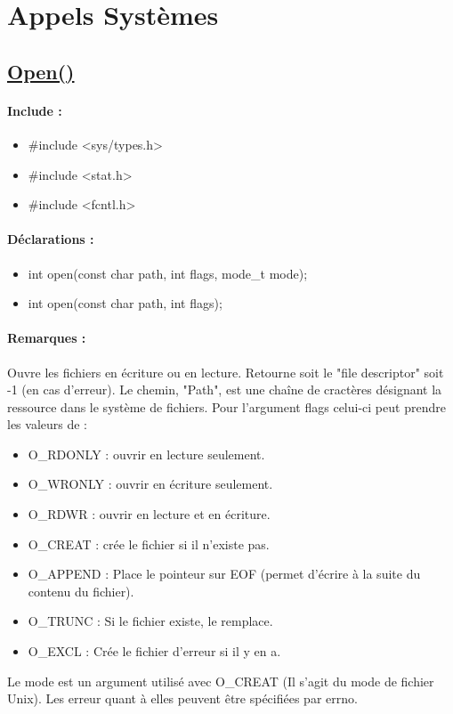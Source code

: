 \documentclass{article}[12pt]
\begin{document}
\section{Appels Systèmes}
\subsection{\href{http://jp.barralis.com/linux-man/man2/open.2.php}{Open()}}
\paragraph{Include : }
\begin{itemize}
	\item \#include <sys/types.h>
	\item \#include <stat.h>
	\item \#include <fcntl.h>
\end{itemize}
\paragraph{Déclarations : }
\begin{itemize}
	\item int open(const char \* path, int flags, mode\_t mode);
	\item int open(const char \* path, int flags);
\end{itemize}
\paragraph{Remarques : }
Ouvre les fichiers en écriture ou en lecture. Retourne soit le "file descriptor" soit -1 (en cas d'erreur). Le chemin, "Path", est une chaîne de cractères désignant la ressource dans le système de fichiers. Pour l'argument flags celui-ci peut prendre les valeurs de :
\begin{itemize}
	\item O\_RDONLY : ouvrir en lecture seulement.
	\item O\_WRONLY : ouvrir en écriture seulement.
	\item O\_RDWR : ouvrir en lecture et en écriture.
	\item O\_CREAT : crée le fichier si il n'existe pas.
	\item O\_APPEND : Place le pointeur sur EOF (permet d'écrire à la suite du contenu du fichier).
	\item O\_TRUNC : Si le fichier existe, le remplace.
	\item O\_EXCL : Crée le fichier d'erreur si il y en a.
\end{itemize}
Le mode est un argument utilisé avec O\_CREAT (Il s'agit du mode de fichier Unix). Les erreur quant à elles peuvent être spécifiées par errno.
\end{document}
